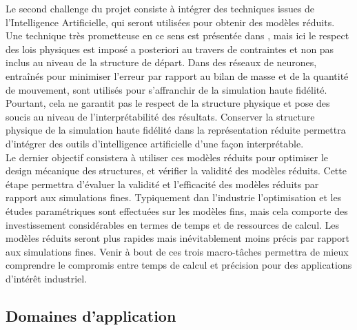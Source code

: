 \documentclass[12pt, french]{article}
\begin{document}
Le second challenge du projet consiste à intégrer des techniques issues de l’Intelligence
Artificielle, qui seront utilisées pour obtenir des modèles réduits. Une technique très prometteuse en ce sens est présentée dans \cite{lee2020}, mais ici le respect des lois physiques est imposé a posteriori au travers de contraintes et non pas inclus au niveau de la structure de départ. Dans \cite{sun2020physics} des réseaux de neurones, entraînés pour minimiser l’erreur par rapport au bilan de masse et de la quantité de mouvement, sont utilisés pour s’affranchir de la simulation haute fidélité. Pourtant, cela ne garantit pas le respect de la structure physique et pose des soucis au niveau de l’interprétabilité des résultats. Conserver la structure physique de la simulation haute fidélité dans la représentation réduite permettra d’intégrer des outils d’intelligence artificielle d’une façon interprétable. \\

Le dernier objectif consistera à utiliser ces modèles réduits pour optimiser le design
mécanique des structures, et vérifier la validité des modèles réduits. Cette étape permettra
d’évaluer la validité et l’efficacité des modèles réduits par rapport aux simulations fines.
Typiquement dan l'industrie l’optimisation et les études paramétriques sont effectuées sur les
modèles fins, mais cela comporte des investissement considérables en termes de temps et de
ressources de calcul. Les modèles réduits seront plus rapides mais inévitablement
moins précis par rapport aux simulations fines. Venir à bout de ces trois macro-tâches
permettra de mieux comprendre le compromis entre temps de calcul et précision pour des
applications d’intérêt industriel. 

\subsection{Domaines d'application}
\end{document}
